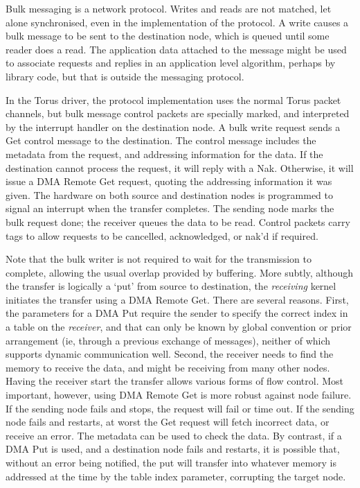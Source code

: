 Bulk messaging is a network protocol. Writes and reads are not matched, let alone synchronised, even in the implementation of the protocol. A write causes a bulk message to be sent to the destination node, which is queued until some reader does a read.
The application data attached to the message might be used to associate requests and replies in an application level algorithm, perhaps by library code,
but that is outside the messaging protocol.

In the Torus driver, the protocol implementation uses the normal Torus packet channels, but bulk message control packets are specially marked, and interpreted by the interrupt handler on the destination node. A bulk write request sends a Get control message to the destination. The control message includes the metadata from the request, and addressing information for the data. If the destination cannot process the request, it will reply with a Nak. Otherwise, it will issue a DMA Remote Get request, quoting the addressing information it was given. The hardware on both source and destination nodes is programmed to signal an interrupt when the transfer completes. The sending node marks the bulk request done; the receiver queues the data to be read. Control packets carry tags to allow requests to be cancelled, acknowledged, or nak'd if required.

Note that the bulk writer is not required to wait for the transmission to complete,
allowing the usual overlap provided by buffering.
More subtly, although the transfer is logically a `put' from source to destination,
the \emph{receiving} kernel initiates the transfer using a DMA Remote Get.
There are several reasons. First, the parameters for a DMA Put require the sender to specify the correct index in a table on the \emph{receiver}, and that can only be known by global convention or prior arrangement (ie, through a previous exchange of messages), neither of which supports dynamic communication well. Second, the receiver needs to find the memory to receive the data, and might be receiving from many other nodes.
Having the receiver start the transfer allows various forms of flow control.
Most important, however, using DMA Remote Get is more robust against node failure.
If the sending node fails and stops, the request will fail or time out.
If the sending node fails and restarts, at worst the Get request will fetch incorrect
data, or receive an error. The metadata can be used to check the data.
By contrast, if a DMA Put is used, and a destination node fails and restarts,
it is possible that, without an error being notified, the put will transfer into
whatever memory is addressed at the time by the table index parameter,
corrupting the target node.

